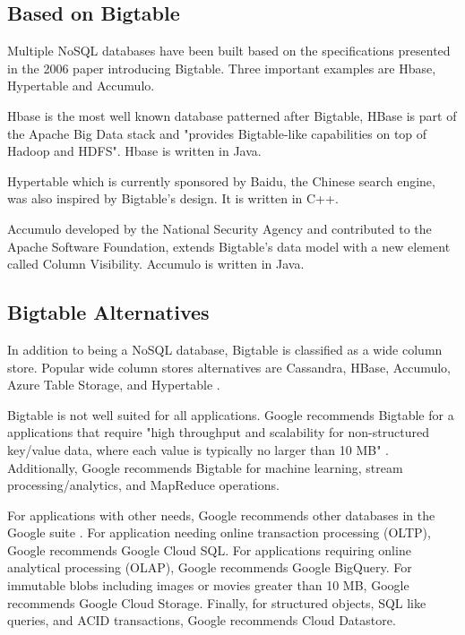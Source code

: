 \documentclass[9pt,twocolumn,twoside]{styles/osajnl}
\begin{document}
\subsection{Based on Bigtable}

Multiple NoSQL databases have been built based on the specifications presented in the 2006 paper introducing Bigtable. Three important examples are Hbase, Hypertable and Accumulo.

Hbase \cite{www-hbase} is the most well known database patterned after Bigtable, HBase is part of the Apache Big Data stack and "provides Bigtable-like capabilities on top of Hadoop and HDFS"\cite{www-hbase}.  Hbase is written in Java.

Hypertable \cite{www-wikihypertable} which is currently sponsored by Baidu, the Chinese search engine, was also inspired by Bigtable's design.  It is written in C++.

Accumulo \cite{www-wikiaccumulo} developed by the National Security Agency and contributed to the Apache Software Foundation, extends Bigtable's data model with a new element called Column Visibility.  Accumulo is written in Java.

\subsection{Bigtable Alternatives}

In addition to being a NoSQL database, Bigtable is classified as a wide column store.  Popular wide column stores alternatives are Cassandra, HBase, Accumulo, Azure Table Storage, and Hypertable \cite{www-dbengineswide}.

Bigtable is not well suited for all applications.  Google recommends Bigtable for a applications that require "high throughput and scalability for non-structured key/value data, where each value is typically no larger than 10 MB" \cite{www-bigtabledocoverview}.  Additionally, Google recommends Bigtable for machine learning, stream processing/analytics, and MapReduce operations.\cite{www-bigtabledocoverview}

For applications with other needs, Google recommends other databases in the Google suite \cite{www-bigtabledocoverview}. For application needing online transaction processing (OLTP), Google recommends Google Cloud SQL. For applications requiring online analytical processing (OLAP), Google recommends Google BigQuery. For immutable blobs including images or movies greater than 10 MB, Google recommends Google Cloud Storage.  Finally, for structured objects, SQL like queries, and ACID transactions, Google recommends Cloud Datastore.
\end{document}
